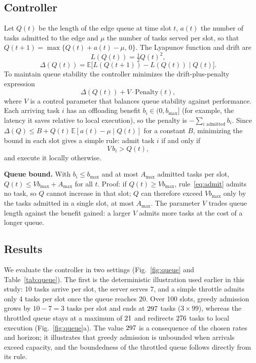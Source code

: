 \documentclass{ieeeaccess}
\begin{document}
\subsection{Controller}
Let $Q(t)$ be the length of the edge queue at time slot $t$, $a(t)$ the number of tasks admitted to the edge and $\mu$ the number of tasks served per slot, so that $Q(t+1)=\max\{Q(t)+a(t)-\mu,\,0\}$. The Lyapunov function and drift are
\begin{equation}
L(Q(t)) = \tfrac12 Q(t)^2,
\end{equation}
\begin{equation}
\Delta(Q(t)) = \mathbb{E}\bigl[L(Q(t+1)) - L(Q(t))\mid Q(t)\bigr].
\end{equation}
To maintain queue stability the controller minimizes the drift-plus-penalty expression
\begin{equation}
\Delta(Q(t)) + V\cdot\text{Penalty}(t),
\label{eq:dpp}
\end{equation}
where $V$ is a control parameter that balances queue stability against performance. Each arriving task $i$ has an offloading benefit $b_i\in(0,b_\text{max}]$ (for example, the latency it saves relative to local execution), so the penalty is $-\sum_{i\text{ admitted}} b_i$. Since $\Delta(Q) \le B + Q(t)\,\mathbb{E}[a(t)-\mu\mid Q(t)]$ for a constant $B$, minimizing the bound in each slot gives a simple rule: admit task $i$ if and only if
\begin{equation}
V\, b_i > Q(t),
\label{eq:admit}
\end{equation}
and execute it locally otherwise.

\textbf{Queue bound.} With $b_i\le b_\text{max}$ and at most $A_\text{max}$ admitted tasks per slot, $Q(t)\le V b_\text{max} + A_\text{max}$ for all $t$. Proof: if $Q(t)\ge V b_\text{max}$, rule~\eqref{eq:admit} admits no task, so $Q$ cannot increase in that slot; $Q$ can therefore exceed $V b_\text{max}$ only by the tasks admitted in a single slot, at most $A_\text{max}$. The parameter $V$ trades queue length against the benefit gained: a larger $V$ admits more tasks at the cost of a longer queue.

\subsection{Results}
We evaluate the controller in two settings (Fig.~\ref{fig:queue} and Table~\ref{tab:queue}). The first is the deterministic illustration used earlier in this study: 10 tasks arrive per slot, the server serves 7, and a simple throttle admits only 4 tasks per slot once the queue reaches 20. Over 100 slots, greedy admission grows by $10-7=3$ tasks per slot and ends at $297$ tasks ($3\times99$), whereas the throttled queue stays at a maximum of $21$ and redirects $276$ tasks to local execution (Fig.~\ref{fig:queue}a). The value $297$ is a consequence of the chosen rates and horizon; it illustrates that greedy admission is unbounded when arrivals exceed capacity, and the boundedness of the throttled queue follows directly from its rule.
\end{document}
